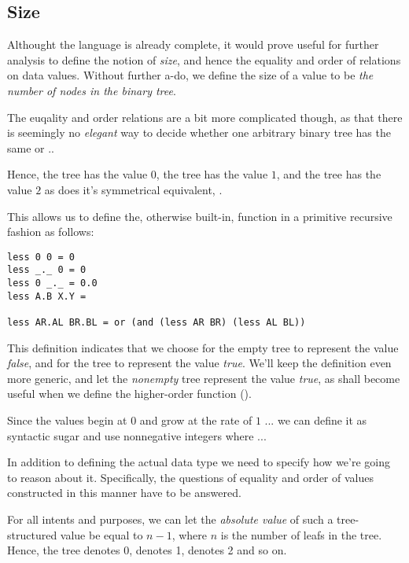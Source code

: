 \subsection{Size}

Althought the language is already complete, it would prove useful for further
analysis to define the notion of \emph{size}, and hence the equality and order
of relations on data values. Without further a-do, we define the size of a
value to be \emph{the number of nodes in the binary tree}.

The euqality and order relations are a bit more complicated though, as that
there is seemingly no \emph{elegant} way to decide whether one arbitrary binary
tree has the same or ..

Hence, the tree  has the value $0$, the tree  has the value
$1$, and the tree  has the value $2$ as does it's symmetrical
equivalent, .

This allows us to define the, otherwise built-in, function  in a
primitive recursive fashion as follows:

\begin{verbatim}
less 0 0 = 0
less _._ 0 = 0
less 0 _._ = 0.0
less A.B X.Y = 

less AR.AL BR.BL = or (and (less AR BR) (less AL BL))
\end{verbatim}

This definition indicates that we choose for the empty tree to represent the
value \emph{false}, and for the tree  to represent the value
\emph{true}. We'll keep the definition even more generic, and let the
\emph{nonempty} tree represent the value \emph{true}, as shall become useful
when we define the higher-order function 
().

Since the values begin at $0$ and grow at the rate of $1$ ... we can define it
as syntactic sugar and use nonnegative integers where ...

In addition to defining the actual data type we need to specify how we're going
to reason about it. Specifically, the questions of equality and order of values
constructed in this manner have to be answered.

For all intents and purposes, we can let the \emph{absolute value} of such a
tree-structured value be equal to $n-1$, where $n$ is the number of leafs in
the tree. Hence, the tree  denotes $0$,  denotes 1,
 denotes 2 and so on.

